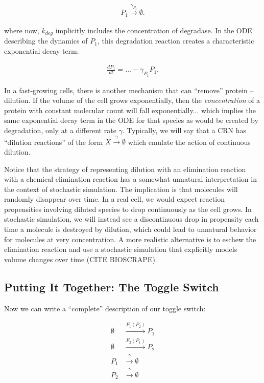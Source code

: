 \documentclass[preprint,12pt]{elsarticle}
\begin{document}
\begin{align}\label{eq:deg2}
	P_1 \xrightarrow{\gamma_{P_1}} \emptyset.
\end{align}

where now, $k_{deg}$ implicitly includes the concentration of degradase. In the ODE describing the dynamics of $P_1$, this degradation reaction creates a characteristic exponential decay term:

\begin{align}
	\frac{dP_1}{dt} = \hdots - \gamma_{P_1}P_1.
\end{align}

In a fast-growing cells, there is another mechanism that can ``remove'' protein -- dilution. If the volume of the cell grows exponentially, then the \emph{concentration} of a protein with constant molecular count will fall exponentially... which implies the same exponential decay term in the ODE for that species as would be created by degradation, only at a different rate $\gamma$. Typically, we will say that a CRN has ``dilution reactions'' of the form $X \xrightarrow{\gamma} \emptyset$ which emulate the action of continuous dilution.

Notice that the strategy of representing dilution with an elimination reaction with a chemical elimination reaction has a somewhat unnatural interpretation in the context of stochastic simulation. The implication is that molecules will randomly disappear over time. In a real cell, we would expect reaction propensities involving diluted species to drop continuously as the cell grows. In stochastic simulation, we will instead see a discontinuous drop in propensity each time a molecule is destroyed by dilution, which could lead to unnatural behavior for molecules at very concentration. A more realistic alternative is to eschew the elimination reaction and use a stochastic simulation that explicitly models volume changes over time (CITE BIOSCRAPE).

\subsection{Putting It Together: The Toggle Switch}

Now we can write a ``complete'' description of our toggle switch:

\begin{align}
	\emptyset &\xrightarrow{F_1(P_2)} P_1\\
	\emptyset &\xrightarrow{F_2(P_1)} P_2\\
	P_1 &\xrightarrow{\gamma} \emptyset\\
	P_2 &\xrightarrow{\gamma} \emptyset	
\end{align}
\end{document}
